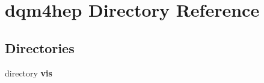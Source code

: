 \section{dqm4hep Directory Reference}
\label{dir_dc33e8f5d29e23248e7e620fc03f4944}
\subsection*{Directories}
\begin{DoxyCompactItemize}
\item 
directory {\bf vis}
\end{DoxyCompactItemize}
